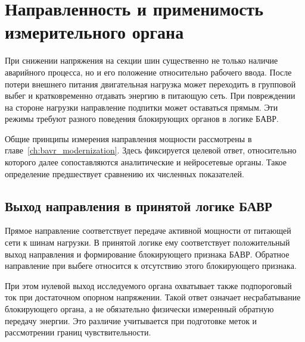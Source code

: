 \section{Направленность и применимость измерительного органа}
\label{sec:ch5_direction_validity}

При снижении напряжения на секции шин существенно
не только наличие аварийного процесса, но и его
положение относительно рабочего ввода.
После потери внешнего питания двигательная нагрузка
может переходить в групповой выбег и кратковременно
отдавать энергию в питающую сеть.
При повреждении на стороне нагрузки направление
подпитки может оставаться прямым.
Эти режимы требуют разного поведения
блокирующих органов в логике БАВР.

Общие принципы измерения направления мощности
рассмотрены в главе~\ref{ch:bavr_modernization}.
Здесь фиксируется целевой ответ,
относительно которого далее сопоставляются
аналитические и нейросетевые органы.
Такое определение предшествует сравнению
их численных показателей.

\subsection{Выход направления в принятой логике БАВР}
\label{sec:ch5_direction_target}

{}

Прямое направление соответствует передаче активной мощности
от питающей сети к шинам нагрузки.
В принятой логике ему соответствует
положительный выход направления и формирование
блокирующего признака БАВР.
Обратное направление при выбеге относится
к отсутствию этого блокирующего признака.

При этом нулевой выход исследуемого органа
охватывает также подпороговый ток
при достаточном опорном напряжении.
Такой ответ означает несрабатывание блокирующего
органа, а не обязательно физически измеренный
обратную передачу энергии.
Это различие учитывается при подготовке меток
и рассмотрении границ чувствительности.

